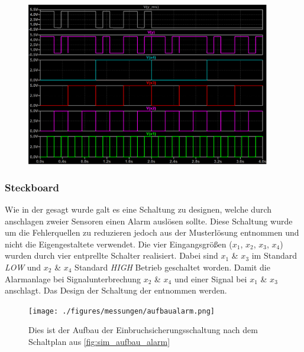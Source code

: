 \documentclass[12pt,english,ngerman]{scrartcl}
\begin{document}

\begin{figure}[H]
  \centering
    \includegraphics[width=0.95\textwidth]{./simdaten_lab/logic/master_verlauf.png}
  \caption{}
  \label{fig:sim_alarm_wahrheit}
\end{figure}


\subsubsection{Steckboard}
Wie in der  gesagt wurde galt es eine Schaltung
zu designen, welche durch anschlagen zweier Sensoren einen Alarm auslösen
sollte. Diese Schaltung wurde um die Fehlerquellen zu reduzieren jedoch aus der
Musterlösung entnommen und nicht die Eigengestaltete verwendet. Die vier
Eingangsgrößen ($x_1$, $x_2$, $x_3$, $x_4$) wurden durch vier entprellte
Schalter realisiert. Dabei sind $x_1$ \& $x_3$ im Standard \textit{LOW} und
$x_2$ \& $x_4$ Standard \textit{HIGH} Betrieb geschaltet worden. Damit die
Alarmanlage bei Signalunterbrechung $x_2$ \& $x_4$ und einer Signal bei $x_1$
\& $x_3$ anschlagt. Das Design der Schaltung der 
entnommen werden.

\begin{figure}[H]
  \centering
    \texttt{[image: ./figures/messungen/aufbaualarm.png]}
  \caption{Dies ist der Aufbau der Einbruchsicherungsschaltung nach dem
  Schaltplan aus \autoref{fig:sim_aufbau_alarm}}
  \label{fig:mess_aufbau_alarm}
\end{figure}
\end{document}
